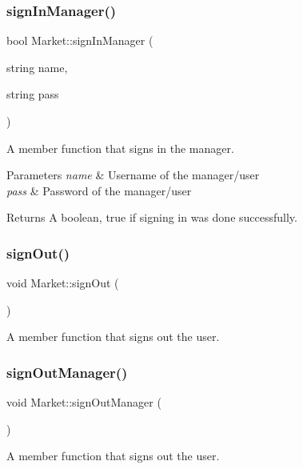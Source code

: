 \subsubsection{\texorpdfstring{sign\+In\+Manager()}{signInManager()}}
{\footnotesize\ttfamily bool Market\+::sign\+In\+Manager (\begin{DoxyParamCaption}\item[{string}]{name,  }\item[{string}]{pass }\end{DoxyParamCaption})}

A member function that signs in the manager. 
\begin{DoxyParams}{Parameters}
{\em name} & Username of the manager/user \\
\hline
{\em pass} & Password of the manager/user \\
\hline
\end{DoxyParams}
\begin{DoxyReturn}{Returns}
A boolean, true if signing in was done successfully. 
\end{DoxyReturn}
\hypertarget{class_market_acbd4a1e28685f78b6b2c59aa5ca9874f}{}\label{class_market_acbd4a1e28685f78b6b2c59aa5ca9874f} 
\subsubsection{\texorpdfstring{sign\+Out()}{signOut()}}
{\footnotesize\ttfamily void Market\+::sign\+Out (\begin{DoxyParamCaption}{ }\end{DoxyParamCaption})}

A member function that signs out the user. \hypertarget{class_market_a59f7b338118ec5b93624a4e6ab62ba6d}{}\label{class_market_a59f7b338118ec5b93624a4e6ab62ba6d} 
\subsubsection{\texorpdfstring{sign\+Out\+Manager()}{signOutManager()}}
{\footnotesize\ttfamily void Market\+::sign\+Out\+Manager (\begin{DoxyParamCaption}{ }\end{DoxyParamCaption})}

A member function that signs out the user. \hypertarget{class_market_ae575e2c591bd3e14bae27b81cfecada9}{}\label{class_market_ae575e2c591bd3e14bae27b81cfecada9} 
